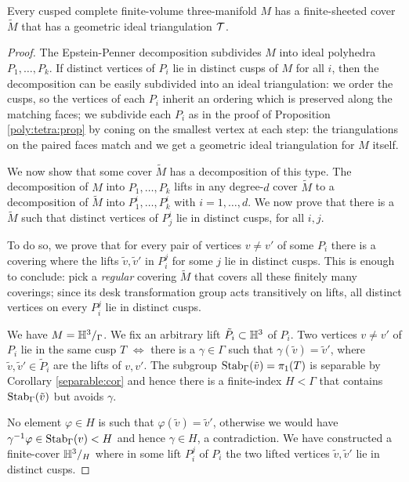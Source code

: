 \begin{teo}
Every cusped complete finite-volume three-manifold $M$ has a finite-sheeted cover $\tilde M$ that has a geometric ideal triangulation $\mathcal{T}$.
\end{teo}
\begin{proof}
The Epstein-Penner decomposition subdivides $M$ into ideal polyhedra $P_1,\ldots, P_k$. If distinct vertices of $P_i$ lie in distinct cusps of $M$ for all $i$, then the decomposition can be easily subdivided into an ideal triangulation: we order the cusps, so the vertices of each $P_i$ inherit an ordering which is preserved along the matching faces; we subdivide each $P_i$ as in the proof of Proposition \ref{poly:tetra:prop} by coning on the smallest vertex at each step: the triangulations on the paired faces match and we get a geometric ideal triangulation for $M$ itself.

We now show that some cover $\tilde M$ has a decomposition of this type. The decomposition of $M$ into $P_1,\ldots, P_k$ lifts in any degree-$d$ cover $\tilde M$ to a decomposition of $\tilde M$ into $P_1^i, \ldots, P_k^i$ with $i=1,\ldots, d$. We now prove that there is a $\tilde M$ such that distinct vertices of $P_j^i$ lie in distinct cusps, for all $i,j$.

To do so, we prove that for every pair of vertices $v \neq v'$ of some $P_i$ there is a covering where the lifts $\tilde v, \tilde v'$ in $P_i^j$ for some $j$ lie in distinct cusps. This is enough to conclude: pick a \emph{regular} covering $\tilde M$ that covers all these finitely many coverings; since its desk transformation group acts transitively on lifts, all distinct vertices on every $P_i^j$ lie in distinct cusps.

We have $M=\mathbb{H}^3/_\Gamma$. We fix an arbitrary lift $\tilde P_i \subset \mathbb{H}^3$ of $P_i$. Two vertices $v \neq v'$ of $P_i$ lie in the same cusp $T$ $\Leftrightarrow$ there is a $\gamma \in \Gamma$ such that $\gamma(\tilde v) = \tilde v'$, where $\tilde v, \tilde v' \in \tilde P_i$ are the lifts of $v,v'$.
The subgroup ${\rm Stab}_\Gamma(\tilde v) = \pi_1(T)$ is separable by Corollary \ref{separable:cor} and hence there is a finite-index $H< \Gamma$ that contains ${\rm Stab}_\Gamma(\tilde v)$ but avoids $\gamma$. 

No element $\varphi\in H$ is such that $\varphi(\tilde v) = \tilde v'$, otherwise we would have $\gamma^{-1}\varphi \in {\rm Stab}_\Gamma(v) < H$ and hence $\gamma \in H$, a contradiction. We have constructed a finite-cover $\mathbb{H}^3/_H$ where in some lift $P_i^j$ of $P_i$ the two lifted vertices $\tilde v,\tilde v'$ lie in distinct cusps.
\end{proof}

